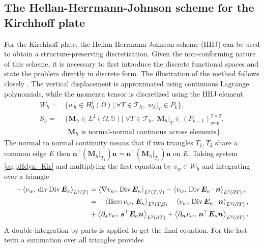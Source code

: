 \subsection{The  Hellan-Herrmann-Johnson scheme for the Kirchhoff plate}\label{sec:HHJ}
For the Kirchhoff plate, the Hellan-Herrmann-Johnson scheme \cite{hellan1967,herrmann1967finite,johnson1973convergence} (HHJ) can be used to obtain a structure-preserving discretization. Given the non-conforming nature of this scheme, it is necessary to first introduce the discrete functional spaces and state the problem directly in discrete form. The illustration of the method follows closely \cite{arnold2019hellan}. The vertical displacement is approximated using continuous Lagrange polynomials, while the momenta tensor is discretized using the HHJ element
\begin{equation}
\label{eq:HHJ}
\begin{aligned}
W_h = &\{w_h \in H^1_0(\Omega)| \; \forall T \in \mathcal{T}_h, \; w_h|_{T} \in P_{k} \}, \\
S_h = &\{\bm{M}_h \in L^2(\Omega, \mathbb{S})| \; \forall T \in \mathcal{T}_h, \; \bm{M}_h|_{T} \in (P_{k-1})^{2\times 2}_{\text{sym}} , \\ 
&\, \ \bm{M}_h \text{ is normal-normal continous across elements}\}.
\end{aligned}
\end{equation}
The normal to normal continuity means that if two triangles $T_1, T_2$ share a common edge $E$ then $\bm{n}^\top (\bm{M}_h|_{T_1}) \bm{n} = \bm{n}^\top (\bm{M}_h|_{T_2}) \bm{n}$ on $E$. Taking system \eqref{eq:pHdyn_Kir} and multiplying the first equation by $v_w \in W_h$ and integrating over a triangle
\begin{equation*}
\begin{aligned}
- \inner[L^2(T)]{v_w}{\div\Div \bm{E}_\kappa} &= \inner[L^2(T, \mathbb{V})]{\nabla v_w}{\Div \bm{E}_\kappa} - \inner[L^2(\partial T)]{v_w}{\Div \bm{E}_\kappa \cdot \bm{n}}, \\
&=-\inner[L^2(T, \mathbb{S})]{\Hess v_w}{\bm{E}_\kappa} - \inner[L^2(\partial T)]{v_w}{\Div \bm{E}_\kappa \cdot \bm{n}}, \\
&+\inner[L^2(\partial T)]{\partial_{\bm{s}} v_w}{\bm{s}^\top\bm{E}_\kappa \bm{n}} + \inner[L^2(\partial T)]{\partial_{\bm{n}} v_w}{\bm{n}^\top\bm{E}_\kappa \bm{n}}. \\
\end{aligned}
\end{equation*}
A double integration by parts is applied to get the final equation. For the last term a summation over all triangles provides
